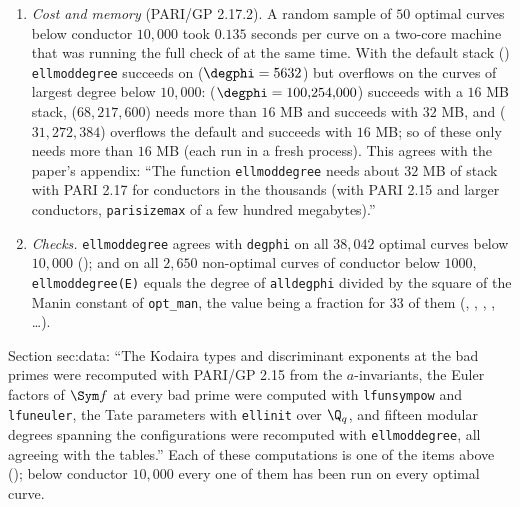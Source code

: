 \begin{sloppypar}
\begin{remark}
\begin{enumerate}[label=(\roman*)]
{increasing stack size}'' when it enlarges the stack.
\item \emph{Cost and memory} (PARI/GP 2.17.2). A random sample of $50$ optimal curves below conductor $10{,}000$ took $0.135$ seconds per curve on a
two-core machine that was running the full check of  at the same time. With the default stack
() \texttt{ellmoddegree} succeeds on  ($\degphi=5632$) but overflows on the curves of largest degree below
$10{,}000$:  ($\degphi=100{,}254{,}000$) succeeds with a $16$ MB stack,  ($68{,}217{,}600$) needs more than $16$ MB and succeeds
with $32$ MB, and  ($31{,}272{,}384$) overflows the default and succeeds with $16$ MB; so of these only 
needs more than $16$ MB (each run in a fresh process). This agrees with the paper's appendix: ``The
function \texttt{ellmoddegree} needs about $32$ MB of stack with PARI 2.17 for conductors in the thousands (with PARI 2.15 and larger
conductors, \texttt{parisizemax} of a few hundred megabytes).''
\item \emph{Checks.} \texttt{ellmoddegree} agrees with \texttt{degphi} on all $38{,}042$ optimal curves below $10{,}000$
(); and on all $2{,}650$ non-optimal curves of conductor below $1000$, \texttt{ellmoddegree(E)} equals the degree
of \texttt{alldegphi} divided by the square of the Manin constant of \texttt{opt\_man}, the value being a fraction for $33$ of them (,
, , , \dots).
\end{enumerate}
\end{remark}

\begin{paperlink}\label{pl:computation:invariants}
Section sec:data: ``The Kodaira types and discriminant exponents at the bad primes were recomputed with PARI/GP 2.15 \cite{PARI} from the
$a$-invariants, the Euler factors of $\Sym f$ at every bad prime were computed with \texttt{lfunsympow} and \texttt{lfuneuler}, the Tate
parameters with \texttt{ellinit} over $\Q_q$, and fifteen modular degrees spanning the configurations were recomputed with
\texttt{ellmoddegree}, all agreeing with the tables.'' Each of these computations is one of the items above
(); below
conductor $10{,}000$ every one of them has been run on every optimal curve.
\end{paperlink}


\end{sloppypar}
